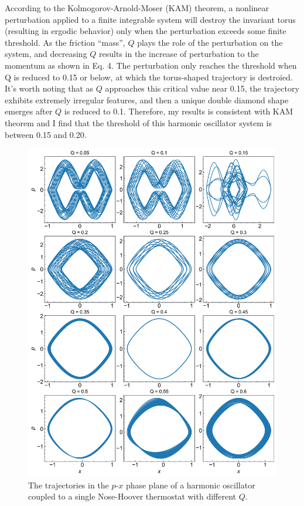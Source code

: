 \documentclass{article}
\begin{document}
According to the Kolmogorov-Arnold-Moser (KAM) theorem, a nonlinear perturbation applied to a finite integrable system will destroy the invariant torus (resulting in ergodic behavior) only when the perturbation exceeds some finite threshold. As the friction ``mass'', $Q$ plays the role of the perturbation on the system, and decreasing $Q$ results in the increase of perturbation to the momentum as shown in Eq. 4. The perturbation only reaches the threshold when Q is reduced to 0.15 or below, at which the torus-shaped trajectory is destroied. It's worth noting that as $Q$ approaches this critical value near 0.15, the trajectory exhibits extremely irregular features, and then a unique double diamond shape emerges after $Q$ is reduced to 0.1. Therefore, my results is consistent with KAM theorem and I find that the threshold of this harmonic oscillator system is between 0.15 and 0.20.

\begin{figure}[p]
    \centering
    \includegraphics[width=\textwidth]{fig1.jpg}
    \caption{The trajectories in the $p$-$x$ phase plane of a harmonic oscillator coupled to a single Nose-Hoover thermostat with different $Q$.}
\end{figure}
\end{document}
